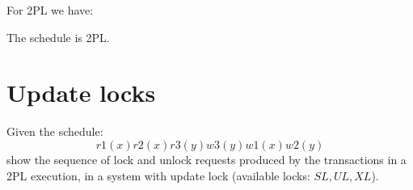 \documentclass[12pt, a4paper]{report}
\begin{document}
        For 2PL we have:
        \begin{table}[H]
            \centering
        \end{table}
        The schedule is 2PL. 

    \newpage

    \section{Update locks}
        Given the schedule:
        \[r1(x) r2(x) r3(y) w3(y) w1(x) w2(y)\]
        show the sequence of lock and unlock requests produced by the transactions in a 2PL execution, in a system with update lock (available locks: $SL, UL, XL$).
\end{document}
